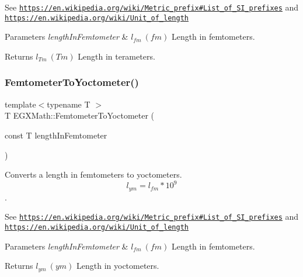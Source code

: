 See \href{https://en.wikipedia.org/wiki/Metric_prefix#List_of_SI_prefixes}{\tt https\+://en.\+wikipedia.\+org/wiki/\+Metric\+\_\+prefix\#\+List\+\_\+of\+\_\+\+S\+I\+\_\+prefixes} and \href{https://en.wikipedia.org/wiki/Unit_of_length}{\tt https\+://en.\+wikipedia.\+org/wiki/\+Unit\+\_\+of\+\_\+length} 
\begin{DoxyParams}{Parameters}
{\em length\+In\+Femtometer} & $ l_{fm}\ (fm)$ Length in femtometers. \\
\hline
\end{DoxyParams}
\begin{DoxyReturn}{Returns}
$ l_{Tm}\ (Tm)$ Length in terameters. 
\end{DoxyReturn}
\mbox{\label{group___e_g_x_math-_conversions-_length_conversions-_femtometer-_s_i_ga6406395140da34327a85098a7dd9e4f0}} 
\subsubsection{\texorpdfstring{Femtometer\+To\+Yoctometer()}{FemtometerToYoctometer()}}
{\footnotesize\ttfamily template$<$typename T $>$ \\
T E\+G\+X\+Math\+::\+Femtometer\+To\+Yoctometer (\begin{DoxyParamCaption}\item[{const T}]{length\+In\+Femtometer }\end{DoxyParamCaption})}



Converts a length in femtometers to yoctometers. \[ l_{ym}=l_{fm} * 10^{9} \]. 

See \href{https://en.wikipedia.org/wiki/Metric_prefix#List_of_SI_prefixes}{\tt https\+://en.\+wikipedia.\+org/wiki/\+Metric\+\_\+prefix\#\+List\+\_\+of\+\_\+\+S\+I\+\_\+prefixes} and \href{https://en.wikipedia.org/wiki/Unit_of_length}{\tt https\+://en.\+wikipedia.\+org/wiki/\+Unit\+\_\+of\+\_\+length} 
\begin{DoxyParams}{Parameters}
{\em length\+In\+Femtometer} & $ l_{fm}\ (fm)$ Length in femtometers. \\
\hline
\end{DoxyParams}
\begin{DoxyReturn}{Returns}
$ l_{ym}\ (ym)$ Length in yoctometers. 
\end{DoxyReturn}
\mbox{\label{group___e_g_x_math-_conversions-_length_conversions-_femtometer-_s_i_gabee380e1753dab5aa9aa433b8f3ce4d4}} 
